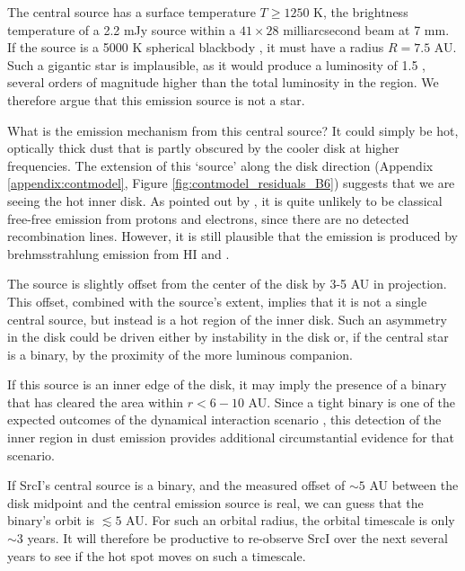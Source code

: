 \documentclass[twocolumn]{aastex61}
\newcommand{\sourcei}{SrcI\xspace}
\begin{document}
The central source has a surface temperature $T\geq1250$ K, the brightness
temperature of a 2.2 mJy source within a $41\times28$ milliarcsecond beam at 7
mm.  If the source is a 5000 K spherical blackbody \citep[e.g.,][]{Testi2010a},
it must have a radius $R=7.5$ AU.  Such a gigantic star is implausible, as it
would produce a luminosity of 1.5 \lsun, several orders of magnitude
higher than the total luminosity in the region.  We therefore argue
that this emission source is not a star.

What is the emission mechanism from this central source?
It could simply be hot, optically thick dust that is partly obscured by the
cooler disk at higher frequencies.  The  extension of this `source' along the
disk direction (Appendix \ref{appendix:contmodel}, Figure
\ref{fig:contmodel_residuals_B6}) suggests that we are
seeing the hot inner disk.  As pointed out by \citet{Plambeck2016a}, it is
quite unlikely to be classical free-free emission from protons
and electrons, since there are no detected
recombination lines.  However, it is still plausible that the emission is
produced by brehmsstrahlung emission from HI and \hh
\citep{Reid2007a,Baez-Rubio2018a}.

The source is slightly offset from the center of the disk by 3-5 AU in
projection.  This offset, combined with the source's extent, implies that it is
not a single central source, but
instead is a hot region of the inner disk.  Such an asymmetry in the disk could
be driven either by instability in the disk or, if the central star is a
binary, by the proximity of the more luminous companion.

If this source is an inner edge of the disk, it may imply the presence of a
binary that has cleared the area within $r<6-10$ AU.  Since a tight binary is
one of the expected outcomes of the dynamical interaction scenario
\citep{Goddi2011b}, this
detection of the inner region in dust emission provides additional
circumstantial evidence for that scenario.

If SrcI's central source is a binary, and the measured offset of $\sim5$ AU
between the disk midpoint and the central emission source is real, we can guess
that the binary's orbit is $\lesssim5$ AU.  For such an orbital radius, the
orbital timescale is only $\sim3$ years.   It will therefore be productive to
re-observe \sourcei over the next several years to see if the hot spot moves on
such a timescale.
\end{document}
